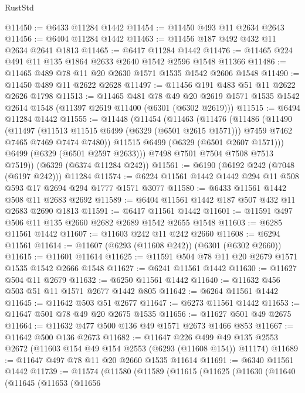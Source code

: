 \begin{lexlean}{RustStd}
\begin{coremodule}
{\begin{coremodule}
{{{{{{{{{{{{{{{{{{{{{{{{{{{{{{{{{{{@11450 := @6433 @11284 @1442
@11454 := @11450 @493 @11 @2634 @2643
@11456 := @6404 @11284 @1442
@11463 := @11456 @187 @492 @432 @11 @2634 @2641 @1813
@11465 := @6417 @11284 @1442
@11476 := @11465 @224 @491 @11 @135 @1864 @2633 @2640 @1542 @2596 @1548 @11366
@11486 := @11465 @489 @78 @11 @20 @2630 @1571 @1535 @1542 @2606 @1548
@11490 := @11450 @489 @11 @2622 @2628
@11497 := @11456 @191 @483 @51 @11 @2622 @2626 @1798
@11513 := @11465
    @481
    @78
    @49
    @20
    @2619
    @1571
    @1535
    @1542
    @2614
    @1548
    (@11397 @2619 @11400 (@6301 (@6302 @2619)))
@11515 := @6494 @11284 @1442
@11555 := @11448
    (@11454
      (@11463
        (@11476
          (@11486
            (@11490
              (@11497
                (@11513 @11515 @6499 (@6329 (@6501 @2615 @1571)))
                @7459
                @7462
                @7465
                @7469
                @7474
                @7480))
            @11515
            @6499
            (@6329 (@6501 @2607 @1571)))
          @6499
          (@6329 (@6501 @2597 @2633)))
        @7498
        @7501
        @7504
        @7508
        @7513
        @7519))
    (@6329 (@6374 @11284 @242))
@11561 := @6190 (@6192 @242 (@7048 (@6197 @242))) @11284
@11574 := @6224 @11561 @1442 @1442 @294 @11 @508 @593 @17 @2694 @294 @1777 @1571 @3077
@11580 := @6433 @11561 @1442 @508 @11 @2683 @2692
@11589 := @6404 @11561 @1442 @187 @507 @432 @11 @2683 @2690 @1813
@11591 := @6417 @11561 @1442
@11601 := @11591 @497 @506 @11 @135 @2660 @2682 @2689 @1542 @2655 @1548
@11603 := @6285 @11561 @1442
@11607 := @11603 @242 @11 @242 @2660
@11608 := @6294 @11561
@11614 := @11607 (@6293 (@11608 @242)) (@6301 (@6302 @2660))
@11615 := @11601 @11614
@11625 := @11591 @504 @78 @11 @20 @2679 @1571 @1535 @1542 @2666 @1548
@11627 := @6241 @11561 @1442
@11630 := @11627 @504 @11 @2679
@11632 := @6250 @11561 @1442
@11640 := @11632 @456 @503 @51 @11 @1571 @2677 @1442 @805
@11642 := @6264 @11561 @1442
@11645 := @11642 @503 @51 @2677
@11647 := @6273 @11561 @1442
@11653 := @11647 @501 @78 @49 @20 @2675 @1535
@11656 := @11627 @501 @49 @2675
@11664 := @11632 @477 @500 @136 @49 @1571 @2673 @1466 @853
@11667 := @11642 @500 @136 @2673
@11682 := @11647
    @226
    @499
    @49
    @135
    @2553
    @2672
    (@11603 @154 @49 @154 @2553 (@6293 (@11608 @154)) @11174)
@11689 := @11647 @497 @78 @11 @20 @2660 @1535 @11614
@11691 := @6340 @11561 @1442
@11739 := @11574
    (@11580
      (@11589
        (@11615
          (@11625
            (@11630
              (@11640
                (@11645
                  (@11653
                    (@11656
}}}}}}}}}}}}}}}}}}}}}}}}}}}}}}}}}}}
\end{coremodule}}
\end{coremodule}
\end{lexlean}
